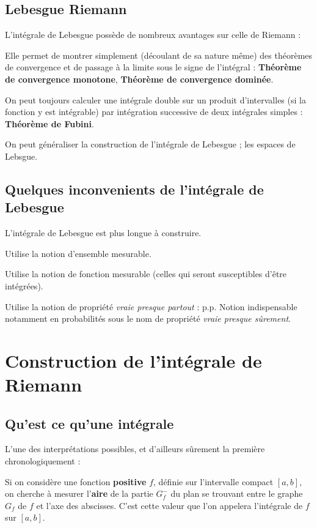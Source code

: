 \subsection*{Lebesgue  Riemann}
L'intégrale de Lebesgue possède de nombreux avantages sur celle de Riemann : 
\ben
	\item Elle permet de montrer simplement (découlant de sa nature même) des théorèmes de convergence et de passage à la limite sous le signe de l'intégral : \textbf{Théorème de convergence monotone}, \textbf{Théorème de convergence dominée}.
	\item {} On peut toujours calculer une intégrale double sur un produit d'intervalles (si la fonction y est intégrable) par intégration successive de deux intégrales simples : \textbf{Théorème de Fubini}.
	\item On peut généraliser la construction de l'intégrale de Lebesgue ; les espaces de Lebsgue.
\een

\subsection*{Quelques inconvenients de l'intégrale de Lebesgue }
\ben
	\item L'intégrale de Lebesgue est plus longue à construire.
	\item Utilise la notion d'ensemble mesurable.
	\item Utilise la notion de fonction mesurable (celles qui seront susceptibles d'être intégrées).
	\item Utilise la notion de propriété \textit{vraie presque partout} : p.p. Notion indispensable notamment en probabilités sous le nom de propriété \textit{vraie presque sûrement}.
\een

\section{Construction de l'intégrale de Riemann}
\subsection{Qu'est ce qu'une intégrale}
L'une des interprétations possibles, et d'ailleurs sûrement la première chronologiquement : 

Si on considère une fonction \textbf{positive} $f$, définie sur l'intervalle compact $[a,b]$, on cherche à mesurer l'\textbf{aire} de la partie $G_f^-$ du plan se trouvant entre le graphe $G_f$ de $f$ et l'axe des abscisses. C'est cette valeur que l'on appelera l'intégrale de $f$ sur $[a,b]$.

